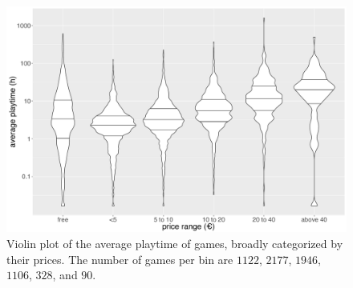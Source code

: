 


\begin{figure}[!t]
	\centering
	\includegraphics[width=1.0\columnwidth]{images/steam-cost-vs-playtime-non-sale.pdf}
	\caption{Violin plot of the average playtime of \steam games, broadly categorized by their prices. The number of games per bin are $1122$, $2177$, $1946$, $1106$, $328$, and $90$.}
\label{fig:steam-cost-vs-playtime-violin}
\end{figure}

